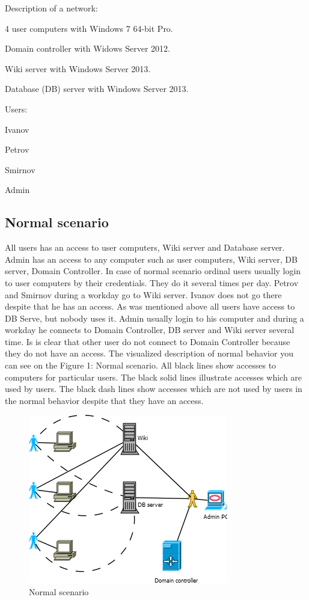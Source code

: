 Description of a network:
\begin{compactitem}
\item 4 user computers with Windows 7 64-bit Pro.
\item Domain controller with Widows Server 2012.
\item Wiki server with Windows Server 2013.
\item Database (DB) server with Windows Server 2013.
\end{compactitem}
Users: 
\begin{compactitem}
\item Ivanov
\item Petrov
\item Smirnov
\item Admin
\end{compactitem}
     
\subsection{Normal scenario}
All users has an access to user computers, Wiki server and Database server. Admin has an access to any computer such as user computers, Wiki server, DB server, Domain Controller. In case of normal scenario ordinal users usually login to user computers by their credentials. They do it several times per day. Petrov and Smirnov during a workday go to Wiki server. Ivanov does not go there despite that he has an access. As was mentioned above all users have access to DB Serve, but nobody uses it. Admin usually login to his computer and during a workday he connects to Domain Controller, DB server and Wiki server several time. Is is clear that other user do not connect to Domain Controller because they do not have an access. The visualized description of normal behavior you can see on the Figure 1: Normal scenario. All black lines show  accesses to computers for particular users. The black solid lines illustrate accesses which are used by users. The black dash lines show accesses which are not used by users in the normal behavior despite that they have an access. 
\begin{figure}[ht!]
\centering
\includegraphics{scenario_normal.png}
\caption{Normal scenario}
\label{overflow}
\end{figure}

